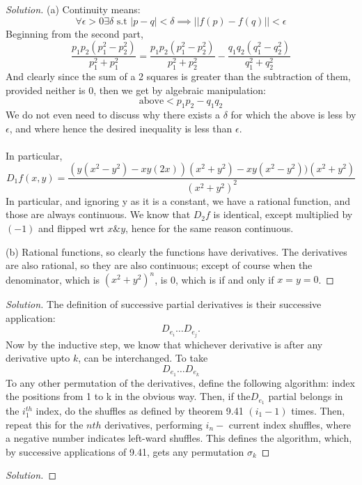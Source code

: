 \documentclass{article}
\newenvironment{problem}[2][Problem]{\begin{trivlist}
\item[\hskip \labelsep {\bfseries #1}\hskip \labelsep {\bfseries #2.}]}{\end{trivlist}}
\newenvironment{solution}{\begin{proof}[Solution]}{\end{proof}}
\begin{document}
\begin{solution}
	(a)	Continuity means: \[
		\forall \epsilon > 0 \exists \delta \text{ s.t } |p-q|<\delta \implies ||f(p)-f(q)||<\epsilon    
	\]
	Beginning from the second part, \[
		\frac{p_{1}p_{2}(p_{1}^{2}-p_{2}^{2})}{p_{1}^{2}+p_{1}^{2}}   = \frac{p_1 p_2(p_{1}^{2}-p_{2}^{2})}{p_{1}^{2}+p_{2}^{2}}- \frac{q_1 q_2(q_{1}^{2}-q_{2}^{2})}{q_{1}^{2}+q_{2}^{2}}   	
	\]
	And clearly since the sum of a 2 squares is greater than the subtraction of them, provided neither is 0, then we get by algebraic manipulation:
	\[
		\text{above}< p_1 p_2 - q_1 q_2
		\]
		We do not even need to discuss why there exists a $\delta$ for which the above is less by $\epsilon$, and where hence the desired inequality is less than $\epsilon$.
\\ \\
In particular, \[
	D_{1}f(x,y) = \frac{(y(x^{2}-y^{2})-xy(2x))(x^{2}+y^{2})- xy(x^{2}-y^{2}))(x^{2}+y^{2})}{(x^{2}+y^{2})^{2}}   
\]
In particular, and ignoring y as it is a constant, we have a rational function, and those are always continuous. We know that $D_{2}f$ is identical, except multiplied by $(-1)$ and flipped wrt $x \& y$, hence for the same reason continuous.

(b) Rational functions, so clearly the functions have derivatives. The derivatives are also rational, so they are also continuous; except of course when the denominator, which is $(x^{2}+y^{2})^{n}$, is 0, which is if and only if $x=y=0$. 
\end{solution}
\begin{problem}{9.29}
\end{problem}
\begin{solution}
	The definition of successive partial derivatives is their successive application: \[
		D_{e_{i}}\dots D_{e_{j}}.
	\]
	Now by the inductive step, we know that whichever derivative is after any derivative upto $k$, can be interchanged. To take \[
		D_{e_{1}}\dots D_{e_{k}}
	\] To any other permutation of the derivatives, define the following algorithm: index the positions from 1 to k in the obvious way. Then, if the$D_{e_{1}}$ partial belongs in the $i_{1}^{th}$ index, do the shuffles as defined by theorem 9.41 $(i_{1}-1)$ times. Then, repeat this for the $nth$ derivatives, performing $i_{n}- \text{ current index}$ shuffles, where a negative number indicates left-ward shuffles. This defines the algorithm, which, by successive applications of 9.41, gets any permutation $\sigma_{k}$

\end{solution}

\begin{problem}{}
\end{problem}

\begin{solution}
\end{solution}
\end{document}
